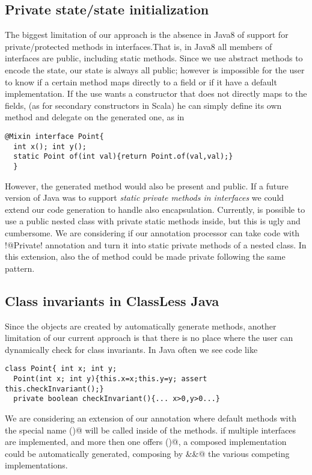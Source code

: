\subsection{Private state/state initialization}
The biggest limitation of our approach is the absence in Java8 of support for private/protected methods in interfaces.That is, in Java8 all members of interfaces are public, including static methods.
Since we use abstract methods to encode the state, our state is always all public; however is impossible for the user to know if a certain method maps directly to a field or if it have a default implementation.
If the use wants a constructor that does not directly maps to the fields, (as for secondary constructors in Scala) he can simply define its own \Q@of@ method and delegate on the generated one, as in
\begin{lstlisting}
@Mixin interface Point{
  int x(); int y();
  static Point of(int val){return Point.of(val,val);}  
  }
\end{lstlisting}
However, the generated \Q@of@ method would also be present and public.
If a future version of Java was to support \emph{static private methods in interfaces} we could extend our code generation to handle also encapsulation.
Currently, is possible to use a public nested class with private static methods inside, but this is ugly and cumbersome. We are considering if our annotation processor can take code with \Q!@Private! annotation and turn it into static private methods of a nested class. In this extension,  also the of method could be made private following the same pattern. 

\subsection{Class invariants in ClassLess Java}
Since the objects are created by automatically generate methods,
another limitation of our current approach is that there is no place where the user can dynamically check for class invariants.
In Java often we see code like
\begin{lstlisting}
class Point{ int x; int y;
  Point(int x; int y){this.x=x;this.y=y; assert this.checkInvariant();}
  private boolean checkInvariant(){... x>0,y>0...}
\end{lstlisting} 

We are considering an extension of our annotation where 
default methods with the special name \Q@checkInvariant()@ will be called inside of the \Q@of@ methods.
if multiple interfaces are implemented, and more then one offers
\Q@checkInvariant()@,  a composed implementation could be automatically generated, composing by \Q@&&@ the various competing implementations.

